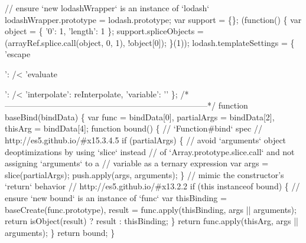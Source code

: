 \begin{DoxyCodeInclude}
\textcolor{stringliteral}{  // ensure `new lodashWrapper` is an instance of `lodash`}
\textcolor{stringliteral}{  lodashWrapper.prototype = lodash.prototype;}
\textcolor{stringliteral}{}
\textcolor{stringliteral}{  var support = \{\};}
\textcolor{stringliteral}{}
\textcolor{stringliteral}{  (function() \{}
\textcolor{stringliteral}{    var object = \{ '}0\textcolor{stringliteral}{': 1, '}length\textcolor{stringliteral}{': 1 \};}
\textcolor{stringliteral}{}
\textcolor{stringliteral}{    support.spliceObjects = (arrayRef.splice.call(object, 0, 1), !object[0]);}
\textcolor{stringliteral}{  \}(1));}
\textcolor{stringliteral}{}
\textcolor{stringliteral}{  lodash.templateSettings = \{}
\textcolor{stringliteral}{}
\textcolor{stringliteral}{    '}escape\textcolor{stringliteral}{': /<%
\textcolor{stringliteral}{}
\textcolor{stringliteral}{    '}evaluate\textcolor{stringliteral}{': /<%
\textcolor{stringliteral}{}
\textcolor{stringliteral}{    '}interpolate\textcolor{stringliteral}{': reInterpolate,}
\textcolor{stringliteral}{}
\textcolor{stringliteral}{    '}variable\textcolor{stringliteral}{': '}\textcolor{stringliteral}{'}
\textcolor{stringliteral}{  \};}
\textcolor{stringliteral}{}
\textcolor{stringliteral}{  /*--------------------------------------------------------------------------*/}
\textcolor{stringliteral}{}
\textcolor{stringliteral}{  function baseBind(bindData) \{}
\textcolor{stringliteral}{    var func = bindData[0],}
\textcolor{stringliteral}{        partialArgs = bindData[2],}
\textcolor{stringliteral}{        thisArg = bindData[4];}
\textcolor{stringliteral}{}
\textcolor{stringliteral}{    function bound() \{}
\textcolor{stringliteral}{      // `Function#bind` spec}
\textcolor{stringliteral}{      // http://es5.github.io/#x15.3.4.5}
\textcolor{stringliteral}{      if (partialArgs) \{}
\textcolor{stringliteral}{        // avoid `arguments` object deoptimizations by using `slice` instead}
\textcolor{stringliteral}{        // of `Array.prototype.slice.call` and not assigning `arguments` to a}
\textcolor{stringliteral}{        // variable as a ternary expression}
\textcolor{stringliteral}{        var args = slice(partialArgs);}
\textcolor{stringliteral}{        push.apply(args, arguments);}
\textcolor{stringliteral}{      \}}
\textcolor{stringliteral}{      // mimic the constructor'}s `\textcolor{keywordflow}{return}` behavior
      \textcolor{comment}{// http://es5.github.io/#x13.2.2}
      \textcolor{keywordflow}{if} (\textcolor{keyword}{this} instanceof bound) \{
        \textcolor{comment}{// ensure `new bound` is an instance of `func`}
        var thisBinding = baseCreate(func.prototype),
            result = func.apply(thisBinding, args || arguments);
        \textcolor{keywordflow}{return} isObject(result) ? result : thisBinding;
      \}
      \textcolor{keywordflow}{return} func.apply(thisArg, args || arguments);
    \}
    \textcolor{keywordflow}{return} bound;
  \}

}}
\end{DoxyCodeInclude}
